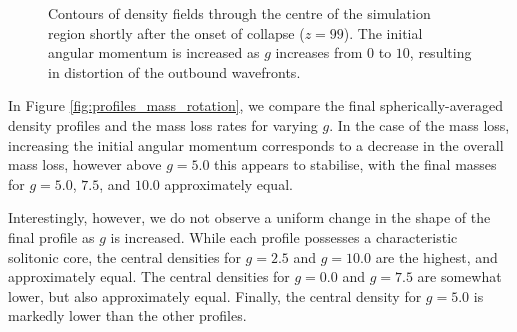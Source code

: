 \documentclass[a4paper,11pt]{article}
\begin{document}
\begin{figure}[!htb]
\endminipage\hfill
\caption{Contours of density fields through the centre of the simulation region shortly after the onset of collapse ($z=99$). The initial angular momentum is increased as $g$ increases from $0$ to $10$, resulting in distortion of the outbound wavefronts.}
\label{fig:rotation_contours}
\end{figure}

In Figure \ref{fig:profiles_mass_rotation}, we compare the final spherically-averaged density profiles and the mass loss rates for varying $g$. In the case of the mass loss, increasing the initial angular momentum corresponds to a decrease in the overall mass loss, however above $g = 5.0$ this appears to stabilise, with the final masses for $g = 5.0$, $7.5$, and $10.0$ approximately equal. 

Interestingly, however, we do not observe a uniform change in the shape of the final profile as $g$ is increased. While each profile possesses a characteristic solitonic core, the central densities for $g = 2.5$ and $g = 10.0$ are the highest, and approximately equal. The central densities for $g = 0.0$ and $g = 7.5$ are somewhat lower, but also approximately equal. Finally, the central density for $g = 5.0$ is markedly lower than the other profiles.  
\end{document}
